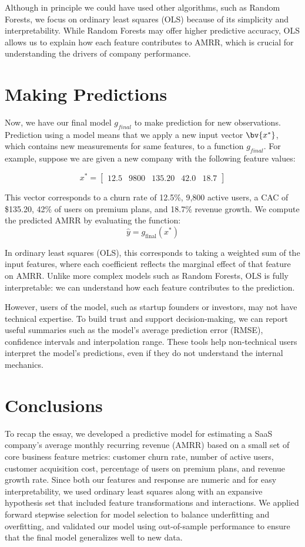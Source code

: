 \documentclass[12pt]{article}
\begin{document}
Although in principle we could have used other algorithms, such as Random Forests, we focus on ordinary least squares (OLS) because of its simplicity and interpretability. While Random Forests may offer higher predictive accuracy, OLS allows us to explain how each feature contributes to AMRR, which is crucial for understanding the drivers of company performance. 




\section{Making Predictions}

Now, we have our final model \(g_{final}\) to make prediction for new observations. Prediction using a model means that we apply a new input vector \(\bv{x^*}\), which contains new measurements for same features, to a function \(g_{final}\). For example, suppose we are given a new company with the following feature values:

\[
x^* =
\begin{bmatrix}
12.5 & 9800 & 135.20 & 42.0 & 18.7
\end{bmatrix}
\]

This vector corresponds to a churn rate of 12.5\%, 9,800 active users, a CAC of \$135.20, 42\% of users on premium plans, and 18.7\% revenue growth. We compute the predicted AMRR by evaluating the function:
\[
\hat{y} = g_{\text{final}}(x^*)
\]

In ordinary least squares (OLS), this corresponds to taking a weighted sum of the input features, where each coefficient reflects the marginal effect of that feature on AMRR. Unlike more complex models such as Random Forests, OLS is fully interpretable: we can understand how each feature contributes to the prediction.

However, users of the model, such as startup founders or investors, may not have technical expertise. To build trust and support decision-making, we can report useful summaries such as the model's average prediction error (RMSE), confidence intervals and interpolation range. These tools help non-technical users interpret the model’s predictions, even if they do not understand the internal mechanics.

\section{Conclusions}

To recap the essay, we developed a predictive model for estimating a SaaS company's average monthly recurring revenue (AMRR) based on a small set of core business feature metrics: customer churn rate, number of active users, customer acquisition cost, percentage of users on premium plans, and revenue growth rate. Since both our features and response are numeric and for easy interpretability, we used ordinary least squares along with an expansive hypothesis set that included feature transformations and interactions. We applied forward stepwise selection for model selection to balance underfitting and overfitting, and validated our model using out-of-sample performance to ensure that the final model generalizes well to new data.
\end{document}
